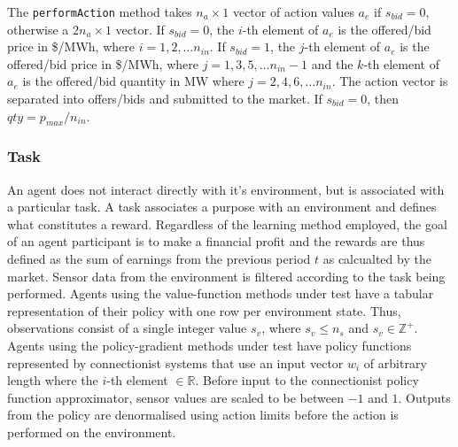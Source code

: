 The \texttt{performAction} method takes $n_a \times 1$ vector of action values
$a_e$ if $s_{bid} = 0$, otherwise a $2n_a \times 1$ vector.  If $s_{bid} = 0$,
the $i$-th element of $a_e$ is the offered/bid price in \$/MWh, where
$i = 1,2,\dotsc n_{in}$.  If $s_{bid} = 1$, the $j$-th element of $a_e$ is the
offered/bid price in \$/MWh, where $j = 1,3,5,\dotsc n_{in}-1$ and the $k$-th
element of $a_e$ is the offered/bid quantity in MW where $j = 2,4,6,\dotsc
n_{in}$.  The action vector is separated into offers/bids and submitted to the
market.  If $s_{bid} = 0$, then $qty = p_{max}/n_{in}$.

\subsubsection{Task}
An agent does not interact directly with it's environment, but is associated
with a particular task.  A task associates a purpose with an environment and
defines what constitutes a reward.  Regardless of the learning method employed,
the goal of an agent participant is to make a financial profit and the rewards
are thus defined as the sum of earnings from the previous period $t$ as
calcualted by the market.  Sensor data from the environment is filtered
according to the task being performed.  Agents using the value-function methods
under test have a tabular representation of their policy with one row per
environment state.  Thus, observations consist of a single integer value $s_v$,
where $s_v \leq n_s$ and $s_v \in \mathbb{Z}^+$.  Agents using the
policy-gradient methods under test have policy functions represented by
connectionist systems that use an input vector $w_i$ of arbitrary length where
the $i$-th element $\in \mathbb{R}$.  Before input to the connectionist policy
function approximator, sensor values are scaled to be between $-1$ and $1$.
Outputs from the policy are denormalised using action limits before the
action is performed on the environment.

